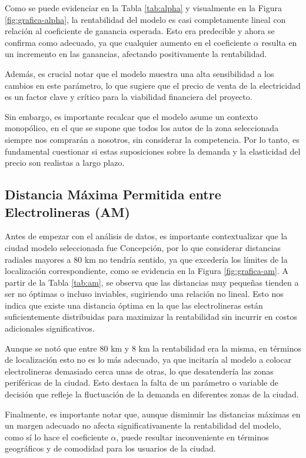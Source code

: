 \documentclass[letterpaper]{article}
\begin{document}
\begin{flushleft}
	Como se puede evidenciar en la Tabla \ref{tab:alpha} y visualmente en la Figura \ref{fig:grafica-alpha}, la rentabilidad del modelo es casi completamente lineal con relación al coeficiente de ganancia esperada. Esto era predecible y ahora se confirma como adecuado, ya que cualquier aumento en el coeficiente $\alpha$ resulta en un incremento en las ganancias, afectando positivamente la rentabilidad.

	Además, es crucial notar que el modelo muestra una alta sensibilidad a los cambios en este parámetro, lo que sugiere que el precio de venta de la electricidad es un factor clave y crítico para la viabilidad financiera del proyecto.

	Sin embargo, es importante recalcar que el modelo asume un contexto monopólico, en el que se supone que todos los autos de la zona seleccionada siempre nos comprarán a nosotros, sin considerar la competencia. Por lo tanto, es fundamental cuestionar si estas suposiciones sobre la demanda y la elasticidad del precio son realistas a largo plazo.

	\subsection{Distancia Máxima Permitida entre Electrolineras (AM)}

	Antes de empezar con el análisis de datos, es importante contextualizar que la ciudad modelo seleccionada fue Concepción, por lo que considerar distancias radiales mayores a 80 km no tendría sentido, ya que excedería los límites de la localización correspondiente, como se evidencia en la Figura \ref{fig:grafica-am}. A partir de la Tabla \ref{tab:am}, se observa que las distancias muy pequeñas tienden a ser no óptimas o incluso inviables, sugiriendo una relación no lineal. Esto nos indica que existe una distancia óptima en la que las electrolineras están suficientemente distribuidas para maximizar la rentabilidad sin incurrir en costos adicionales significativos.

	Aunque se notó que entre 80 km y 8 km la rentabilidad era la misma, en términos de localización esto no es lo más adecuado, ya que incitaría al modelo a colocar electrolineras demasiado cerca unas de otras, lo que desatendería las zonas periféricas de la ciudad. Esto destaca la falta de un parámetro o variable de decisión que refleje la fluctuación de la demanda en diferentes zonas de la ciudad.

	Finalmente, es importante notar que, aunque disminuir las distancias máximas en un margen adecuado no afecta significativamente la rentabilidad del modelo, como sí lo hace el coeficiente $\alpha$, puede resultar inconveniente en términos geográficos y de comodidad para los usuarios de la ciudad.


\end{flushleft}
\end{document}
